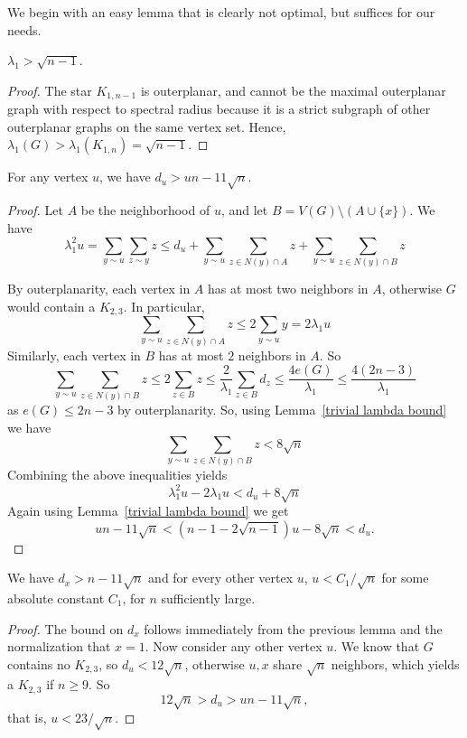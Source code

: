 We begin with an easy lemma that is clearly not optimal, but suffices for our needs.
\begin{lemma}\label{trivial lambda bound}
 $\lambda_1 > \sqrt{n-1}$.
\end{lemma}
\begin{proof}
 The star $K_{1,n-1}$ is outerplanar, and cannot be the maximal outerplanar
 graph with respect to spectral radius because it is a strict subgraph of other outerplanar graphs on the same vertex set.  Hence, $\lambda_1(G) > \lambda_1(K_{1,n}) = \sqrt{n-1}$.
\end{proof}

\begin{lemma}
 For any vertex $u$, we have $d_u > un - 11\sqrt{n}$.
\end{lemma}
\begin{proof}
 Let $A$ be the neighborhood of $u$, and let $B = V(G) \setminus (A\cup \{x\})$.  We have 
  \[ \lambda_1^2 u = \sum_{y \sim u} \sum_{z \sim y} z \leq d_u + \sum_{y \sim u} \sum_{z \in N(y)\cap A} z + \sum_{y \sim u} \sum_{z \in N(y)\cap B} z \]

\noindent By outerplanarity, each vertex in $A$ has at most two neighbors in $A$, otherwise
$G$ would contain a $K_{2,3}$.  In particular,
 \[ \sum_{y \sim u} \sum_{z \in N(y)\cap A} z  \leq 2 \sum_{y \sim u} y = 2\lambda_1 u \]
Similarly, each vertex in $B$ has at most $2$ neighbors in $A$.  So
 \[ \sum_{y \sim u} \sum_{z \in N(y)\cap B} z \leq 2 \sum_{z \in B} z \leq \frac{2}{\lambda_1} \sum_{z \in B} d_z \leq \frac{4e(G)}{\lambda_1} \leq \frac{4(2n-3)}{\lambda_1}\]
as  $e(G) \leq 2n-3$ by outerplanarity.  So, using Lemma~\ref{trivial lambda bound} we have
 \[ \sum_{y \sim u} \sum_{z \in N(y)\cap B} z < 8 \sqrt{n}\]
Combining the above inequalities yields
 \[ \lambda_1^2 u - 2\lambda_1 u < d_u + 8 \sqrt{n}\]
Again using Lemma~\ref{trivial lambda bound} we get
 \[ un - 11\sqrt{n} <  (n-1 - 2\sqrt{n-1}) u - 8 \sqrt{n} < d_u .\]
\end{proof}

\begin{lemma}\label{small eigvec}
 We have $d_x > n - 11 \sqrt{n}$ and for every other vertex $u$, $u < C_1 / \sqrt{n}$ for some absolute constant $C_1$, for $n$ sufficiently large.
\end{lemma}
\begin{proof}
The bound on $d_x$ follows immediately from the previous lemma and the normalization that
$x=1$.  Now consider any other vertex $u$.  We know that $G$ contains no $K_{2,3}$, so $d_u < 12 \sqrt{n}$, otherwise $u,x$ share $\sqrt{n}$ neighbors, which
yields a $K_{2,3}$ if $n \geq 9$.  So
 \[ 12 \sqrt{n} > d_u > u n - 11\sqrt{n}, \]
that is, $u < 23 / \sqrt{n}$.
\end{proof}

